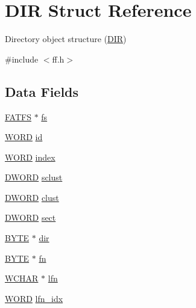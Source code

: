 \hypertarget{structDIR}{}\section{D\+IR Struct Reference}
\label{structDIR}


Directory object structure (\hyperlink{structDIR}{D\+IR})  




{\ttfamily \#include $<$ff.\+h$>$}

\subsection*{Data Fields}
\begin{DoxyCompactItemize}
\item 
\hyperlink{structFATFS}{F\+A\+T\+FS} $\ast$ \hyperlink{structDIR_a312eaa66cb703fb2993ea98173dc0c9a}{fs}
\item 
\hyperlink{integer_8h_a197942eefa7db30960ae396d68339b97}{W\+O\+RD} \hyperlink{structDIR_aca2c95a99a04173917ec70c030891383}{id}
\item 
\hyperlink{integer_8h_a197942eefa7db30960ae396d68339b97}{W\+O\+RD} \hyperlink{structDIR_ab95119fbacbe45e3e9ee0f962b844092}{index}
\item 
\hyperlink{integer_8h_ad342ac907eb044443153a22f964bf0af}{D\+W\+O\+RD} \hyperlink{structDIR_a9212af5877b94d790dd3bab3aa320994}{sclust}
\item 
\hyperlink{integer_8h_ad342ac907eb044443153a22f964bf0af}{D\+W\+O\+RD} \hyperlink{structDIR_acfbb8ba2d6e73b6f999ceffd1857c190}{clust}
\item 
\hyperlink{integer_8h_ad342ac907eb044443153a22f964bf0af}{D\+W\+O\+RD} \hyperlink{structDIR_ad01fcc812ed0dad11a593574336adc9e}{sect}
\item 
\hyperlink{integer_8h_a4ae1dab0fb4b072a66584546209e7d58}{B\+Y\+TE} $\ast$ \hyperlink{structDIR_a6c2a8c0cf2d55ae99775e93a16593449}{dir}
\item 
\hyperlink{integer_8h_a4ae1dab0fb4b072a66584546209e7d58}{B\+Y\+TE} $\ast$ \hyperlink{structDIR_a32da2f31d6c3b6c42eef981cb0cfd2ee}{fn}
\item 
\hyperlink{integer_8h_a570001c92f314285ad3e7139d8c58cf7}{W\+C\+H\+AR} $\ast$ \hyperlink{structDIR_af62fd789383e6f1397f74617e11c135d}{lfn}
\item 
\hyperlink{integer_8h_a197942eefa7db30960ae396d68339b97}{W\+O\+RD} \hyperlink{structDIR_acad41b18758c9278c14d47076e8149fc}{lfn\+\_\+idx}
\end{DoxyCompactItemize}


